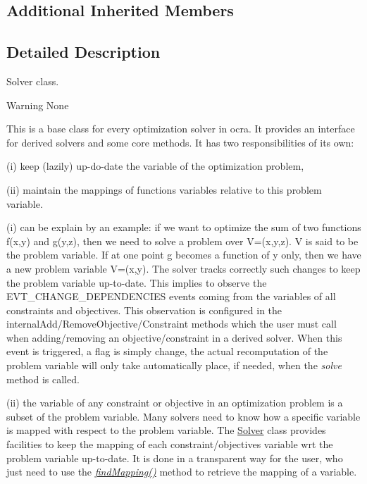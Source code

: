 \subsection*{Additional Inherited Members}


\subsection{Detailed Description}
Solver class. 

\begin{DoxyWarning}{Warning}
None
\end{DoxyWarning}
This is a base class for every optimization solver in ocra. It provides an interface for derived solvers and some core methods. It has two responsibilities of its own\+:
\begin{DoxyItemize}
\item (i) keep (lazily) up-\/do-\/date the variable of the optimization problem,
\item (ii) maintain the mappings of function\textquotesingle{}s variables relative to this problem variable.
\end{DoxyItemize}

(i) can be explain by an example\+: if we want to optimize the sum of two functions f(x,y) and g(y,z), then we need to solve a problem over V=(x,y,z). V is said to be the problem variable. If at one point g becomes a function of y only, then we have a new problem variable V\textquotesingle{}=(x,y). The solver tracks correctly such changes to keep the problem variable up-\/to-\/date. This implies to observe the E\+V\+T\+\_\+\+C\+H\+A\+N\+G\+E\+\_\+\+D\+E\+P\+E\+N\+D\+E\+N\+C\+I\+ES events coming from the variables of all constraints and objectives. This observation is configured in the internal\+Add/\+Remove\+Objective/\+Constraint methods which the user must call when adding/removing an objective/constraint in a derived solver. When this event is triggered, a flag is simply change, the actual recomputation of the problem variable will only take automatically place, if needed, when the {\itshape solve} method is called.

(ii) the variable of any constraint or objective in an optimization problem is a subset of the problem variable. Many solvers need to know how a specific variable is mapped with respect to the problem variable. The \hyperlink{classocra_1_1Solver}{Solver} class provides facilities to keep the mapping of each constraint/objective\textquotesingle{}s variable wrt the problem variable up-\/to-\/date. It is done in a transparent way for the user, who just need to use the {\itshape \hyperlink{classocra_1_1Solver_a67ee15c2dd55a5345f3872b35fca59cd}{find\+Mapping()}} method to retrieve the mapping of a variable.

